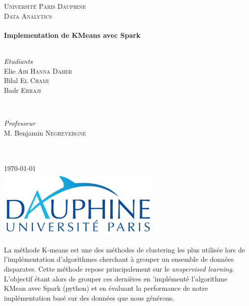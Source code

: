 \documentclass[french]{article}
\begin{document}
\begin{titlepage}
\SetDate[29/04/2018]
\newcommand{\HRule}{\rule{\linewidth}{0.5mm}}
\center 
\textsc{\LARGE Université Paris Dauphine}\\[1.5cm] 
\textsc{\Large Data Analytics}\\[0.5cm]
\HRule \\[0.4cm] { \huge \bfseries
Implementation de KMeans avec Spark}\\[0.4cm] \HRule \\[1.5cm]
\begin{minipage}{0.4\textwidth}
	\begin{flushleft} \large
		\emph{Etudiants}
		\\ Elie \textsc{Abi Hanna Daher}
		\\ Bilal \textsc{El Chami}
		\\ Badr \textsc{Erraji}
	\end{flushleft}
\end{minipage}
~
\begin{minipage}{0.4\textwidth}
	\begin{flushright} \large
		\emph{Professeur} 
		\\ M. Benjamin \textsc{Negrevergne}
		\\  \hspace{1cm}
		\\  \hspace{1cm}
	\end{flushright}
\end{minipage}\\[2cm]
{\large \today}\\[2cm]
\includegraphics[width=8cm]{img/dauphine.png}
\vfill
\end{titlepage}
 
\tableofcontents 
\newpage
La méthode K-means est une des méthodes de clustering les plus utilisée lors de l’implémentation d’algorithmes cherchant à grouper un ensemble de données disparates. Cette méthode repose principalement sur le \textit{unspervised learning}.
L’objectif étant alors de grouper ces dernières en 'implémenté l'algorithme KMean avec Spark (python) et en évaluant la performance de notre implémentation basé sur des données que nous générons.
\end{document}
